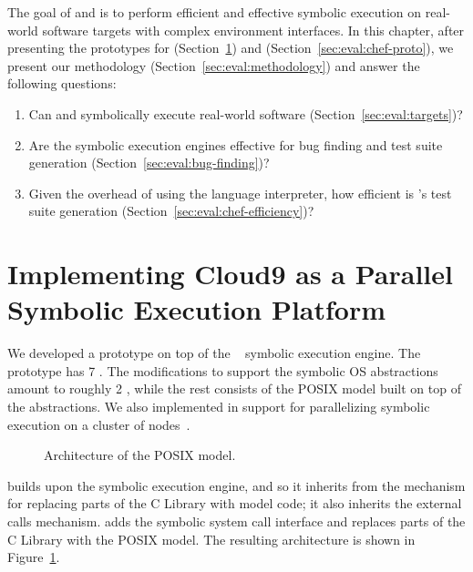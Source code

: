 The goal of \chef and \cnine is to perform efficient and effective symbolic execution on real-world software targets with complex environment interfaces.
%
In this chapter, after presenting the prototypes for \cnine (Section~\ref{sec:eval:cnine-proto}) and \chef (Section~\ref{sec:eval:chef-proto}), we present our methodology (Section~\ref{sec:eval:methodology}) and answer the following questions:
\begin{enumerate}
\item Can \chef and \cnine symbolically execute real-world software (Section~\ref{sec:eval:targets})?
\item Are the symbolic execution engines effective for bug finding and test suite generation (Section~\ref{sec:eval:bug-finding})?
\item Given the overhead of using the language interpreter, how efficient is \chef's test suite generation (Section~\ref{sec:eval:chef-efficiency})?
\end{enumerate}

\section{Implementing Cloud9 as a Parallel Symbolic Execution Platform}
\label{sec:eval:cnine-proto}

We developed a \cnine prototype on top of the \klee~\cite{klee} symbolic execution engine.  The prototype has 7 \kloc.
%
The \klee modifications to support the symbolic OS abstractions amount to roughly 2 \kloc, while the rest consists of the POSIX model built on top of the abstractions.
%
We also implemented in \cnine support for parallelizing symbolic execution on a cluster of nodes~\cite{cloud9}.

\begin{figure}[h!]
  \centering
  \caption{Architecture of the \cnine POSIX model.}
  \label{fig:cloud9:posixmodel}
\end{figure}

\cnine builds upon the \klee symbolic execution engine, and so it inherits from \klee the mechanism for replacing parts of the C Library with model code; it also inherits the external calls mechanism.  \cnine adds the symbolic system call interface and replaces parts of the C Library with the POSIX model.  The resulting architecture is shown in Figure~\ref{fig:cloud9:posixmodel}.

\newcommand{\cI}{\!{\raisebox{-0.2ex}{\large\ding{192}}}\xspace}
\newcommand{\cII}{\!{\raisebox{-0.2ex}{\large\ding{193}}}\xspace}
\newcommand{\cIII}{\!{\raisebox{-0.2ex}{\large\ding{194}}}\xspace}
\newcommand{\cIV}{\!{\raisebox{-0.2ex}{\large\ding{195}}}\xspace}
\newcommand{\cV}{\!{\raisebox{-0.2ex}{\large\ding{196}}}\xspace}
\newcommand{\cVI}{\!{\raisebox{-0.2ex}{\large\ding{197}}}\xspace}
\newcommand{\cVII}{\!{\raisebox{-0.2ex}{\large\ding{198}}}\xspace}
\newcommand{\cVIII}{\!{\raisebox{-0.2ex}{\large\ding{199}}}\xspace}


